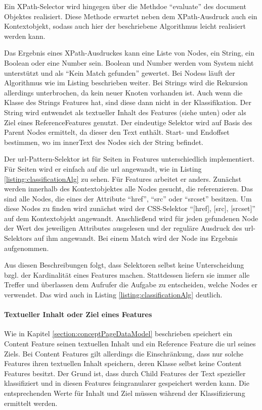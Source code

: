     Ein XPath-Selector wird hingegen über die Methdoe "`evaluate"' des document Objektes realisiert.
    Diese Methode erwartet neben dem XPath-Ausdruck auch ein Kontextobjekt,
    sodass auch hier der beschriebene Algorithmus leicht realisiert werden kann.
    
    Das Ergebnis eines XPath-Ausdruckes kann eine Liste von Nodes, ein String,
    ein Boolean oder eine Number sein.
    Boolean und Number werden vom System nicht unterstützt und als "`Kein Match gefunden"' gewertet.
    Bei Nodess läuft der Algorithmus wie im Listing beschrieben weiter.
    Bei Strings wird die Rekursion allerdings unterbrochen, da kein neuer Knoten vorhanden ist.
    Auch wenn die Klasse des Strings Features hat, sind diese dann nicht in der Klassifikation.
    Der String wird entwendet als textueller Inhalt des Features (siehe unten) oder als Ziel
    eines ReferenceFeatures genutzt.
    Der eindeutige Selektor wird auf Basis des Parent Nodes ermittelt, da dieser den Text enthält.
    Start- und Endoffset bestimmen, wo im innerText des Nodes sich der String befindet.

    Der \gls{url}-Pattern-Selektor ist für Seiten in Features unterschiedlich implementiert.
    Für Seiten wird er einfach auf die \gls{url} angewandt, wie in Listing \ref{listing:classificationAlg} zu sehen.
    Für Features arbeitet er anders.
    Zunächst werden innerhalb des Kontextobjektes alle Nodes gesucht, die {\resources} referenzieren.
    Das sind alle Nodes, die eines der Attribute "`href"', "`src"' oder "`srcset"' besitzen.
    Um diese Nodes zu finden wird zunächst wird der CSS-Selektor "`[href], [src], [srcset]"' auf dem Kontextobjekt angewandt.
    Anschließend wird für jeden gefundenen Node der Wert des jeweiligen Attributes ausgelesen
    und der reguläre Ausdruck des \gls{url}-Selektors auf ihm angewandt.
    Bei einem Match wird der Node ins Ergebnis aufgenommen.

    Aus diesen Beschreibungen folgt, dass Selektoren selbst keine Unterscheidung bzgl.
    der Kardinalität eines Features machen.
    Stattdessen liefern sie immer alle Treffer und überlassen dem Aufrufer die Aufgabe zu entscheiden,
    welche Nodes er verwendet.
    Das wird auch in Listing \ref{listing:classificationAlg} deutlich.
    
    \paragraph{Textueller Inhalt oder Ziel eines Features}
    Wie in Kapitel \ref{section:conceptPageDataModel} beschrieben speichert
    ein Content Feature seinen textuellen Inhalt und ein Reference Feature die \gls{url} seines Ziels.
    Bei Content Features gilt allerdings die Einschränkung, dass nur solche Features ihren textuellen Inhalt speichern,
    deren Klasse selbst keine Content Features besitzt.
    Der Grund ist, dass durch Child Features der Text spezieller klassifiziert und in diesen Features
    feingranularer gespeichert werden kann.
    Die entsprechenden Werte für Inhalt und Ziel müssen während der Klassifizierung ermittelt werden.

